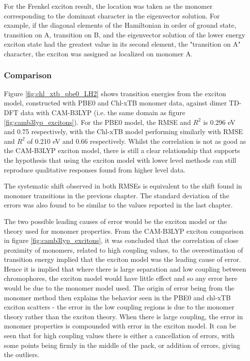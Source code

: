 For the Frenkel exciton result, the location was taken as the monomer corresponding
to the dominant character in the eigenvector solution. For example, if the diagonal
elements of the Hamiltonian in order of ground state, transition on A, transition
on B, and the eigenvector solution of the lower energy exciton state had the greatest
value in its second element, the "transition on A" character, the exciton was assigned
as localized on monomer A.

\subsubsection{Comparison}
\label{subsec:state_assign}

Figure \ref{fig:chl_xtb_pbe0_LH2} shows transition energies from the exciton model,
constructed with PBE0 and Chl-xTB monomer data, against dimer TD-DFT data with CAM-B3LYP
(i.e. the same domain as figure \ref{fig:camb3lyp_excitons}). For the PBE0 model,
the RMSE and $R^2$ is 0.296 eV and 0.75 respectively, with the Chl-xTB model performing
similarly with RMSE and $R^2$ of 0.210 eV and 0.66 respectively. Whilst the correlation
is not as good as the CAM-B3LYP exciton model, there is still a clear relationship 
that supports the hypothesis that using the exciton model with lower level methods can
still reproduce qualitative responses found from higher level data.

The systematic shift observed in both RMSEs is equivalent to the shift found in 
monomer transitions in the previous chapter. The standard deviation of the errors 
was also found to be similar to the values reported in the last chapter.

The two possible leading causes of error would be the exciton model or the theory 
used for monomer properties. From the CAM-B3LYP exciton comparison in figure \ref{fig:camb3lyp_excitons},
it was concluded that the correlation of close proximity of monomers, related to 
high coupling values, to the overestimation of transition energy implied that the 
exciton model was the leading cause of error. Hence it is implied that where there
is large separation and low coupling between chromophores, the exciton model would 
have little effect and so any error here would be due to the monomer model used. 
The origin of error being from the monomer method then explains the behavior seen
in the PBE0 and chl-xTB exciton scatters - the error in the low coupling regions
is due to the monomer theory rather than the exciton theory. When there is large
coupling, the error in monomer properties is compounded with error in the exciton
model. It can be seen that for high coupling values there is either a cancellation
of errors, with some points being firmly in the middle of the pack, or addition 
of errors, giving the outliers.

